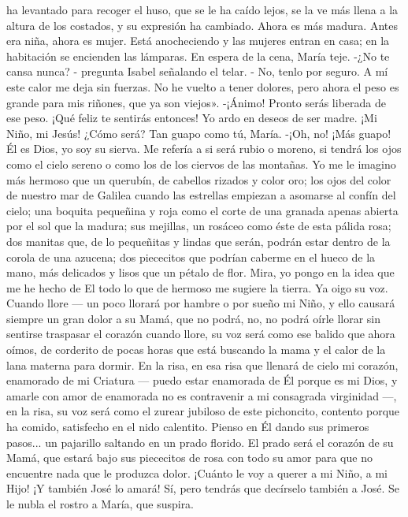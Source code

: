 \documentclass[12pt]{book} %
\begin{document}
ha levantado para recoger el huso, que se le ha caído lejos, se la ve más llena a la altura de los costados, y su expresión ha cambiado. Ahora es más madura. Antes era niña, ahora es mujer. 
Está anocheciendo y las mujeres entran en casa; en la habitación se encienden las lámparas. En espera de la cena, María teje. 
-¿No te cansa nunca? - pregunta Isabel señalando el telar. - No, tenlo por seguro. 
A mí este calor me deja sin fuerzas. No he vuelto a tener dolores, pero ahora el peso es grande para mis riñones, que 
ya son viejos». 
-¡Ánimo! Pronto serás liberada de ese peso. ¡Qué feliz te sentirás entonces! Yo ardo en deseos de ser madre. ¡Mi Niño, mi Jesús! ¿Cómo será? 
Tan guapo como tú, María. 
-¡Oh, no! ¡Más guapo! Él es Dios, yo soy su sierva. Me refería a si será rubio o moreno, si tendrá los ojos como el cielo sereno o como los de los ciervos de las montañas. Yo me le imagino más hermoso que un querubín, de cabellos rizados y color oro; los ojos del color de nuestro mar de Galilea cuando las estrellas empiezan a asomarse al confín del cielo; una boquita pequeñina y roja como el corte de una granada apenas abierta por el sol que la madura; sus mejillas, un rosáceo como éste de esta pálida rosa; dos manitas que, de lo pequeñitas y lindas que serán, podrán estar dentro de la corola de una azucena; dos piececitos que podrían caberme en el hueco de la mano, más delicados y lisos que un pétalo de flor. Mira, yo pongo en la idea que me he hecho de El todo lo que de hermoso me sugiere la tierra. Ya oigo su voz. Cuando llore — un poco llorará por hambre o por sueño mi Niño, y ello causará siempre un gran dolor a su Mamá, que no podrá, no, no podrá oírle llorar sin sentirse traspasar el corazón cuando llore, su voz será como ese balido que ahora oímos, de corderito de pocas horas que está buscando la mama y el calor de la lana materna para dormir. En la risa, en esa risa que llenará de cielo mi corazón, enamorado de mi Criatura — puedo estar enamorada de Él porque es mi Dios, y amarle con amor de enamorada no es contravenir a mi consagrada virginidad —, en la risa, su voz será como el zurear jubiloso de este pichoncito, contento porque ha comido, satisfecho en el nido calentito. Pienso en Él dando sus primeros pasos... un pajarillo saltando en un prado florido. El prado será el corazón de su Mamá, que estará bajo sus piececitos de rosa con todo su amor para que no encuentre nada que le produzca dolor. ¡Cuánto le voy a querer a mi Niño, a mi Hijo! ¡Y también José lo amará! 
Sí, pero tendrás que decírselo también a José. 
Se le nubla el rostro a María, que suspira. 
\end{document}
